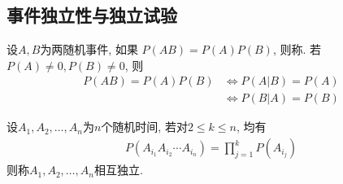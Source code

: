 \subsection{事件独立性与独立试验}
\begin{definition}
    设$A, B$为两随机事件, 如果 $P(AB)=P(A)P(B)$, 则称. 若$P(A)\ne 0, P(B)\ne 0$, 则
    \begin{align*}
        P(AB)=P(A)P(B)&\Longleftrightarrow P(A|B)=P(A)\\
        &\Longleftrightarrow P(B|A)=P(B)
    \end{align*}
\end{definition}
\begin{definition}
    设$A_1,A_2,\dots,A_n$为$n$个随机时间, 若对$2\le k \le n$, 均有
    \begin{align*}
        P(A_{i_1}A_{i_2}\cdots A_{i_n})=\prod_{j=1}^k P(A_{i_j})
    \end{align*}
    则称$A_1,A_2,\dots,A_n$相互独立. 
\end{definition}